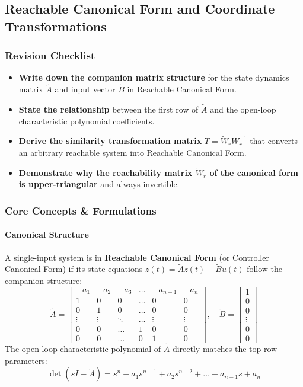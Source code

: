 \documentclass[12pt,onecolumn,twoside ]{article}
\begin{document}
	\subsection{Reachable Canonical Form and Coordinate Transformations}
	\subsubsection{Revision Checklist}
	\begin{itemize}
		\item[$\square$]
		\textbf{Write down the companion matrix structure} for the state dynamics matrix $\tilde{A}$ and input vector $\tilde{B}$ in Reachable Canonical Form.
		\item[$\square$]
		\textbf{State the relationship} between the first row of $\tilde{A}$ and the open-loop characteristic polynomial coefficients.
		\item[$\square$]
		\textbf{Derive the similarity transformation matrix} $T = \tilde{W}_r W_r^{-1}$ that converts an arbitrary reachable system into Reachable Canonical Form.
		\item[$\square$]
		\textbf{Demonstrate why the reachability matrix $\tilde{W}_r$ of the canonical form is upper-triangular} and always invertible.
	\end{itemize}
	
	\subsubsection{Core Concepts \& Formulations}
	\paragraph{Canonical Structure}
	A single-input system is in \textbf{Reachable Canonical Form} (or Controller Canonical Form) if its state equations $\dot{z}(t) = \tilde{A}z(t) + \tilde{B}u(t)$ follow the companion structure: \[
	\tilde{A} = \begin{bmatrix} -a_1 & -a_2 & -a_3 & \dots & -a_{n-1} & -a_n \\ 1 & 0 & 0 & \dots & 0 & 0 \\ 0 & 1 & 0 & \dots & 0 & 0 \\ \vdots & \vdots & \ddots & \dots & \vdots & \vdots \\ 0 & 0 & \dots & 1 & 0 & 0 \\ 0 & 0 & \dots & 0 & 1 & 0 \end{bmatrix}, \quad \tilde{B} = \begin{bmatrix} 1 \\ 0 \\ 0 \\ \vdots \\ 0 \\ 0 \end{bmatrix}
	\]
	The open-loop characteristic polynomial of $\tilde{A}$ directly matches the top row parameters: \[
	\det(sI - \tilde{A}) = s^n + a_1 s^{n-1} + a_2 s^{n-2} + \dots + a_{n-1}s + a_n
	\]
\end{document}
